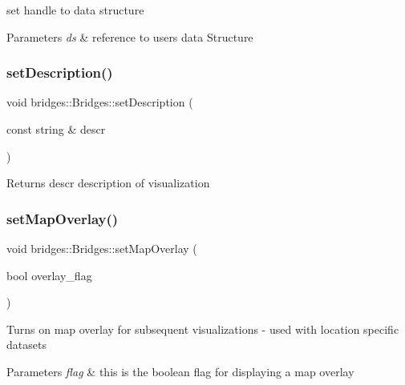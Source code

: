 set handle to data structure


\begin{DoxyParams}{Parameters}
{\em ds} & reference to user\textquotesingle{}s data Structure \\
\hline
\end{DoxyParams}
\mbox{\label{classbridges_1_1_bridges_aa26285a4d04c2759113dcf233406a8da}} 
\subsubsection{\texorpdfstring{setDescription()}{setDescription()}}
{\footnotesize\ttfamily void bridges\+::\+Bridges\+::set\+Description (\begin{DoxyParamCaption}\item[{const string \&}]{descr }\end{DoxyParamCaption})\hspace{0.3cm}{\ttfamily [inline]}}

\begin{DoxyReturn}{Returns}
descr description of visualization 
\end{DoxyReturn}
\mbox{\label{classbridges_1_1_bridges_a221442c674b625a403486076cf8a7c03}} 
\subsubsection{\texorpdfstring{setMapOverlay()}{setMapOverlay()}}
{\footnotesize\ttfamily void bridges\+::\+Bridges\+::set\+Map\+Overlay (\begin{DoxyParamCaption}\item[{bool}]{overlay\+\_\+flag }\end{DoxyParamCaption})\hspace{0.3cm}{\ttfamily [inline]}}

Turns on map overlay for subsequent visualizations -\/ used with location specific datasets


\begin{DoxyParams}{Parameters}
{\em flag} & this is the boolean flag for displaying a map overlay \\
\hline
\end{DoxyParams}
\mbox{\label{classbridges_1_1_bridges_afa05302cf91c91b902aef693525107a5}} 
